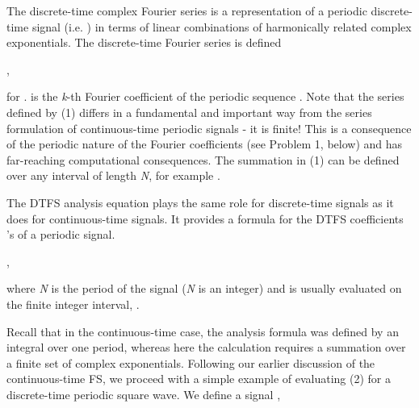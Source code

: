 \documentclass{article}
\begin{document}
\begin{CellGroup}


The discrete-time complex Fourier series is a representation of a periodic discrete-time signal (i.e. 
) in terms of linear combinations of harmonically related complex exponentials. The discrete-time Fourier series is defined 



,

for .  is the {\itshape k}-th Fourier coefficient of the periodic sequence .
Note that the series defined by (1) differs in a fundamental and important way from the series formulation of continuous-time periodic signals -
it is finite! This is a consequence of the periodic nature of the Fourier coefficients (see Problem 1, below) and has far-reaching computational
consequences. The summation in (1) can  be defined over any interval of length {\itshape N}, for example .



The DTFS analysis equation plays the same role for discrete-time signals as it does for continuous-time signals. It provides a formula for the DTFS
coefficients  's of a periodic signal.



, 

where {\itshape N} is the period of the signal  ({\itshape N} is an integer) and  is usually evaluated on
the finite integer interval, .



\begin{CellGroup}



\end{CellGroup}
Recall that in the continuous-time case, the analysis formula was defined by an integral over one period, whereas here the calculation requires a
summation over a finite set of complex exponentials. Following our earlier discussion of the continuous-time FS, we proceed with a simple example
of evaluating (2) for a discrete-time periodic square wave. We define a signal  , 




\end{CellGroup}
\end{document}
